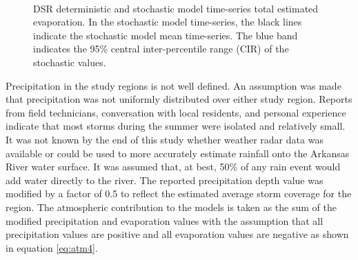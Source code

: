 \begin{landscape}
\begin{figure}
\begin{subfigure}{0.7\textwidth}
		\end{subfigure}\\
		\caption[DSR deterministic and stochastic model time-series total estimated evaporation.]{DSR deterministic and stochastic model time-series total estimated evaporation.  In the stochastic model time-series, the black lines indicate the stochastic model mean time-series.  The blue band indicates the 95\% central inter-percentile range (CIR) of the stochastic values.}
		\label{fig:reachEvap_DS}
	\end{figure}
\end{landscape}

\subtabletop
\begin{table}[htbp]
	\centering
	\caption[USR deterministic and stochastic model time-series total estimated evaporation numeric results.]{USR deterministic and stochastic model time-series total estimated evaporation numeric results.  Total daily evaporation rates are presented in units of \si{\milli\meter} (\si{\inch}).}
	\label{tab:reachEvap_US}
	
\end{table}
\tablevspace
\begin{table}[htbp]
	\centering
	\caption[DSR deterministic and stochastic model time-series total estimated evaporation numeric results.]{DSR deterministic and stochastic model time-series total estimated evaporation numeric results.  Total daily evaporation rates are presented in units of \si{\milli\meter} (\si{\inch}).}
	\label{tab:reachEvap_DS}
	
\end{table}

Precipitation in the study regions is not well defined.  An assumption was made that precipitation was not uniformly distributed over either study region.  Reports from field technicians, conversation with local residents, and personal experience indicate that most storms during the summer were isolated and relatively small.  It was not known by the end of this study whether weather radar data was available or could be used to more accurately estimate rainfall onto the Arkansas River water surface.  It was assumed that, at best, 50\% of any rain event would add water directly to the river.  The reported precipitation depth value was modified by a factor of 0.5 to reflect the estimated average storm coverage for the region.  The atmospheric contribution to the models is taken as the sum of the modified precipitation and evaporation values with the assumption that all precipitation values are positive and all evaporation values are negative as shown in equation \ref{eq:atm4}.

